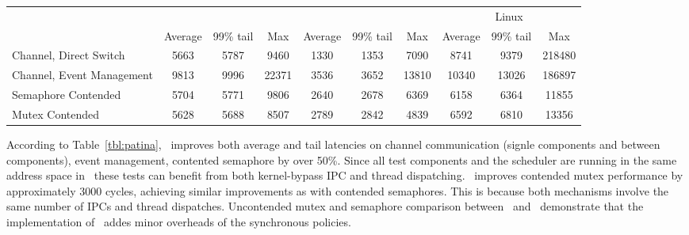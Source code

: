 \begin{table*}[h]
    \centering
	\begin{tabular}{l|c|c|c|c|c|c|c|c|c} \hline
		& \multicolumn{3}{c|}{\cos} & \multicolumn{3}{c|}{\name} & \multicolumn{3}{c}{Linux}\\
			  & Average & 99\% tail & Max & Average & 99\% tail & Max & Average & 99\% tail & Max\\ \hline
		Channel, Direct Switch & 5663 & 5787 & 9460 & 1330 & 1353 & 7090 & 8741 & 9379 & 218480 \\
		Channel, Event Management & 9813 & 9996 & 22371 & 3536 & 3652 & 13810 & 10340 & 13026 & 186897 \\ \hline
		Semaphore Contended & 5704 & 5771 & 9806 & 2640 & 2678 & 6369 & 6158 & 6364 & 11855 \\ \hline
		Mutex Contended & 5628 & 5688 & 8507 & 2789 & 2842 & 4839 & 6592 & 6810 & 13356 \\ \hline
        \end{tabular}
	\caption{\small Patina Overheads in Cycles in \name\ and \cos\ with equivalent Linux operations.}
    \label{tbl:patina}
\end{table*}

According to Table~\ref{tbl:patina}, \name\ improves both average and tail latencies on channel communication (signle components and between components), event management, contented semaphore by over 50\%.
Since all test components and the scheduler are running in the same address space in \name\, these tests can benefit from both kernel-bypass IPC and thread dispatching.
\name\ improves contended mutex performance by approximately 3000 cycles, achieving similar improvements as with contended semaphores.
This is because both mechanisms involve the same number of IPCs and thread dispatches.
Uncontended mutex and semaphore comparison between \name\ and \cos\ demonstrate that the implementation of \name\ addes minor overheads of the synchronous policies.


